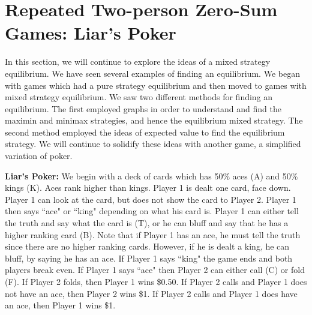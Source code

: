 

\section{Repeated Two-person Zero-Sum Games: Liar's Poker}



\vspace{.1in}
In this section, we will continue to explore the ideas of a mixed strategy equilibrium. We have seen several examples of finding an equilibrium. We began with games which had a pure strategy equilibrium and then moved to games with mixed strategy equilibrium. We saw two different methods for finding an equilibrium. The first employed graphs in order to understand and find the maximin and minimax strategies, and hence the equilibrium mixed strategy. The second method employed the ideas of expected value to find the equilibrium strategy. We will continue to solidify these ideas with another game, a simplified variation of poker.

{\bf Liar's Poker:}
We begin with a deck of cards which has 50\% aces (A) and 50\% kings (K). Aces rank higher than kings. Player 1 is dealt one card, face down. Player 1 can look at the card, but does not show the card to Player 2. Player 1 then says ``ace" or ``king" depending on what his card is. Player 1 can either tell the truth and say what the card is (T), or he can bluff and say that he has a higher ranking card (B). Note that if Player 1 has an ace, he must tell the truth since there are no higher ranking cards. However, if he is dealt a king, he can bluff, by saying he has an ace. If Player 1 says ``king" the game ends and both players break even. If Player 1 says ``ace" then Player 2 can either call (C) or fold (F). If Player 2 folds, then Player 1 wins \$0.50. If Player 2 calls and Player 1 does not have an ace, then Player 2 wins \$1. If Player 2 calls and Player 1 does have an ace, then Player 1 wins \$1.

